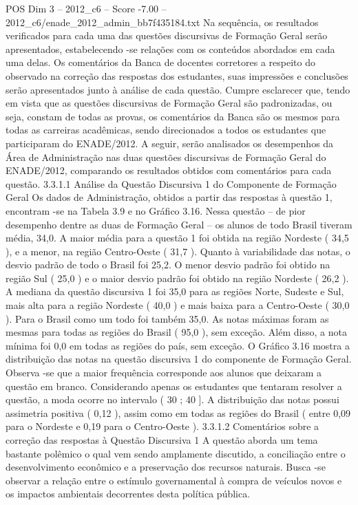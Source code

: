 \begin{textsample}{POS Dim 3 – 2012\_c6 – Score -7.00 – 2012\_c6/enade\_2012\_admin\_bb7f435184.txt}
Na sequência, os resultados verificados para cada uma das questões discursivas de Formação Geral serão apresentados, estabelecendo -se relações com os conteúdos abordados em cada uma delas.
Os comentários da Banca de docentes corretores a respeito do observado na correção das respostas dos estudantes, suas impressões e conclusões serão apresentados junto à análise de cada questão.
Cumpre esclarecer que, tendo em vista que as questões discursivas de Formação Geral são padronizadas, ou seja, constam de todas as provas, os comentários da Banca são os mesmos para todas as carreiras acadêmicas, sendo direcionados a todos os estudantes que participaram do ENADE/2012.
A seguir, serão analisados os desempenhos da Área de Administração nas duas questões discursivas de Formação Geral do ENADE/2012, comparando os resultados obtidos com comentários para cada questão. 3.3.1.1 Análise da Questão Discursiva 1 do Componente de Formação Geral Os dados de Administração, obtidos a partir das respostas à questão 1, encontram -se na Tabela 3.9 e no Gráfico 3.16.
Nessa questão – de pior desempenho dentre as duas de Formação Geral – os alunos de todo Brasil tiveram média, 34,0.
A maior média para a questão 1 foi obtida na região Nordeste ( 34,5 ), e a menor, na região Centro-Oeste ( 31,7 ).
Quanto à variabilidade das notas, o desvio padrão de todo o Brasil foi 25,2.
O menor desvio padrão foi obtido na região Sul ( 25,0 ) e o maior desvio padrão foi obtido na região Nordeste ( 26,2 ).
A mediana da questão discursiva 1 foi 35,0 para as regiões Norte, Sudeste e Sul, mais alta para a região Nordeste ( 40,0 ) e mais baixa para a Centro-Oeste ( 30,0 ).
Para o Brasil como um todo foi também 35,0.
As notas máximas foram as mesmas para todas as regiões do Brasil ( 95,0 ), sem exceção.
Além disso, a nota mínima foi 0,0 em todas as regiões do país, sem exceção.
O Gráfico 3.16 mostra a distribuição das notas na questão discursiva 1 do componente de Formação Geral.
Observa -se que a maior frequência corresponde aos alunos que deixaram a questão em branco.
Considerando apenas os estudantes que tentaram resolver a questão, a moda ocorre no intervalo ( 30 ; 40 ].
A distribuição das notas possui assimetria positiva ( 0,12 ), assim como em todas as regiões do Brasil ( entre 0,09 para o Nordeste e 0,19 para o Centro-Oeste ). 3.3.1.2 Comentários sobre a correção das respostas à Questão Discursiva 1 A questão aborda um tema bastante polêmico o qual vem sendo amplamente discutido, a conciliação entre o desenvolvimento econômico e a preservação dos recursos naturais.
Busca -se observar a relação entre o estímulo governamental à compra de veículos novos e os impactos ambientais decorrentes desta política pública.

\end{textsample}

